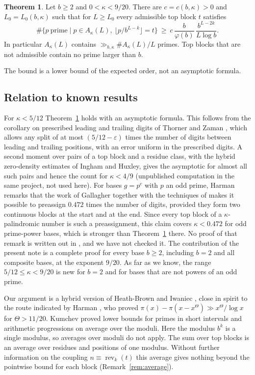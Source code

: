 \documentclass[11pt]{amsart}
\theoremstyle{definition}
\newtheorem{theorem}{Theorem}[section]
\numberwithin{equation}{section}
\newcommand{\rev}{\operatorname{rev}}
\begin{document}
\begin{theorem}\label{thm:main}
Let $b\ge2$ and $0<\kappa<9/20$. There are $c=c(b,\kappa)>0$ and $L_0=L_0(b,\kappa)$ such that for $L\ge L_0$ every admissible top block $t$ satisfies
\[
\#\{p\ \text{prime}\mid p\in A_\kappa(L),\ \lfloor p/b^{L-k}\rfloor=t\}\ \ge\ c\,\frac{b}{\varphi(b)}\,\frac{b^{L-2k}}{L\log b}.
\]
In particular $A_\kappa(L)$ contains $\gg_{b,\kappa}\#A_\kappa(L)/L$ primes. Top blocks that are not admissible contain no prime larger than $b$.
\end{theorem}

The bound is a lower bound of the expected order, not an asymptotic formula.

\subsection{Relation to known results}
For $\kappa<5/12$ Theorem~\ref{thm:main} holds with an asymptotic formula. This follows from the corollary on prescribed leading and trailing digits of Thorner and Zaman \cite[Cor.~3.2]{TZ}, which allows any split of at most $(5/12-\varepsilon)$ times the number of digits between leading and trailing positions, with an error uniform in the prescribed digits. A second moment over pairs of a top block and a residue class, with the hybrid zero-density estimates of Ingham and Huxley, gives the asymptotic for almost all such pairs and hence the count for $\kappa<4/9$ (unpublished computation in the same project, not used here). For bases $g=p^c$ with $p$ an odd prime, Harman \cite[p.~180]{Har06} remarks that the work of Gallagher \cite{Gal} together with the techniques of \cite{Har05} makes it possible to preassign $0.472$ times the number of digits, provided they form two continuous blocks at the start and at the end. Since every top block of a $\kappa$-palindromic number is such a preassignment, this claim covers $\kappa<0.472$ for odd prime-power bases, which is stronger than Theorem~\ref{thm:main} there. No proof of that remark is written out in \cite{Har06}, and we have not checked it. The contribution of the present note is a complete proof for every base $b\ge2$, including $b=2$ and all composite bases, at the exponent $9/20$. As far as we know, the range $5/12\le\kappa<9/20$ is new for $b=2$ and for bases that are not powers of an odd prime.

Our argument is a hybrid version of Heath-Brown and Iwaniec \cite{HBI}, close in spirit to the route indicated by Harman \cite{Har06}, who proved $\pi(x)-\pi(x-x^\Theta)\gg x^\Theta/\log x$ for $\Theta>11/20$. Kumchev \cite{Kum} proved lower bounds for primes in short intervals and arithmetic progressions on average over the moduli. Here the modulus $b^k$ is a single modulus, so averages over moduli do not apply. The sum over top blocks is an average over residues and positions of one modulus. Without further information on the coupling $n\equiv\rev_k(t)$ this average gives nothing beyond the pointwise bound for each block (Remark~\ref{rem:average}).
\end{document}
